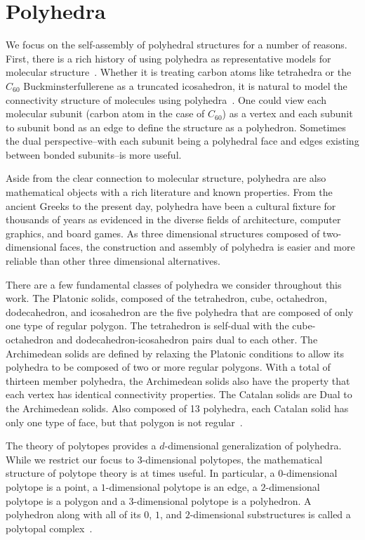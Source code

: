 \section{Polyhedra}

We focus on the self-assembly of polyhedral structures for a number of reasons. First, there is a rich history of using polyhedra as representative models for molecular structure~\cite{Sachse1890}. Whether it is treating carbon atoms like tetrahedra or the $C_{60}$ Buckminsterfullerene as a truncated icosahedron, it is natural to model the connectivity structure of molecules using polyhedra~\cite{Kroto1985}. One could view each molecular subunit (carbon atom in the case of $C_{60}$) as a vertex and each subunit to subunit bond as an edge to define the structure as a polyhedron. Sometimes the dual perspective--with each subunit being a polyhedral face and edges existing between bonded subunits--is more useful. 

Aside from the clear connection to molecular structure, polyhedra are also mathematical objects with a rich literature and known properties. From the ancient Greeks to the present day, polyhedra have been a cultural fixture for thousands of years as evidenced in the diverse fields of architecture, computer graphics, and board games. As three dimensional structures composed of two-dimensional faces, the construction and assembly of polyhedra is easier and more reliable than other three dimensional alternatives. 

There are a few fundamental classes of polyhedra we consider throughout this work. The Platonic solids, composed of the tetrahedron, cube, octahedron, dodecahedron, and icosahedron are the five polyhedra that are composed of only one type of regular polygon. The tetrahedron is self-dual with the cube-octahedron and dodecahedron-icosahedron pairs dual to each other. The Archimedean solids are defined by relaxing the Platonic conditions to allow its polyhedra to be composed of two or more regular polygons. With a total of thirteen member polyhedra, the Archimedean solids also have the property that each vertex has identical connectivity properties. The Catalan solids are Dual to the Archimedean solids. Also composed of 13 polyhedra, each Catalan solid has only one type of face, but that polygon is not regular~\cite{Cromwell1997}.

The theory of polytopes provides a $d$-dimensional generalization of polyhedra. While we restrict our focus to $3$-dimensional polytopes, the mathematical structure of polytope theory is at times useful. In particular, a $0$-dimensional polytope is a point, a $1$-dimensional polytope is an edge, a $2$-dimensional polytope is a polygon and a $3$-dimensional polytope is a polyhedron. A polyhedron along with all of its $0$, $1$, and $2$-dimensional substructures is called a polytopal complex~\cite{Ziegler1995}.

